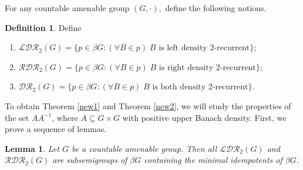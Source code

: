 \documentclass{article}
\theoremstyle{Theorem}
\newtheorem{lem}[thm]{Lemma}
\theoremstyle{definition}
\newtheorem{defn}[thm]{Definition}
\begin{document}
For any countable amenable group $(G,\cdot),$ define the following notions.
\begin{defn} Define
\begin{enumerate}
\item $\mathcal{LDR}_2(G)=\{ p \in \beta G : (\forall B \in p)\; B \text{ is left density $2$-recurrent} \};$
\item $\mathcal{RDR}_2(G)=\{ p \in \beta G : (\forall B \in p)\; B \text{ is right density $2$-recurrent} \};$
\item $\mathcal{DR}_2(G)=\{ p \in \beta G : (\forall B \in p)\; B \text{ is both density $2$-recurrent} \}.$
\end{enumerate}
\end{defn}

To obtain Theorem \ref{new1} and Theorem \ref{new2}, we will study the properties of the set $AA^{-1}$, where $A\subseteq G\times G$ with positive upper Banach density. First, we prove a sequence of lemmas. 



\begin{lem}\label{subsemigroup}
Let $G$ be a countable amenable group. Then all $ \mathcal{LDR}_2(G)$ and $\mathcal{RDR}_2(G)$ are subsemigroups of $\beta G$ containing the minimal idempotents of $\beta G$.
\end{lem}
\end{document}
